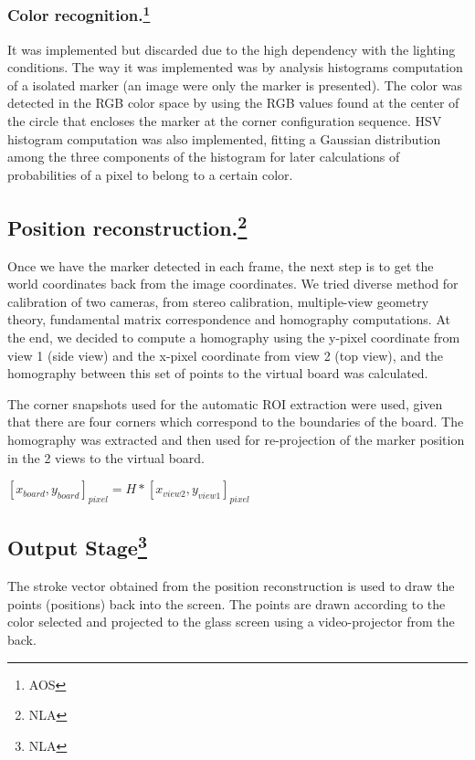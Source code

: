 \documentclass[a4paper,12pt]{article}
\begin{document}
\subsubsection[Color recognition]{Color recognition.\footnote{AOS}}
It was implemented but discarded due to the high dependency with the lighting conditions. The way it was implemented was by analysis histograms computation of a isolated marker (an image were only the marker is presented). The color was detected in the RGB color space by using the RGB values found at the center of the circle that encloses the marker at the corner configuration sequence. HSV histogram computation was also implemented, fitting a Gaussian distribution among the three components of the histogram for later calculations of probabilities of a pixel to belong to a certain color.

\subsection[Position reconstruction.]{Position reconstruction.\footnote{NLA}} 
Once we have the marker detected in each frame, the next step is to get the world coordinates back from the image coordinates. We tried diverse method for calibration of two cameras, from stereo calibration, multiple-view geometry theory, fundamental matrix correspondence and homography computations. At the end, we decided to compute a homography using the y-pixel coordinate from view 1 (side view) and the x-pixel coordinate from view 2 (top view), and the homography between this set of points to the virtual board was calculated. 

The corner snapshots used for the automatic ROI extraction were used, given that there are four corners which correspond to the boundaries of the board. The homography was extracted and then used for re-projection of the marker position in the 2 views to the virtual board.

\begin{center}
$ [x_{board}, y_{board}]_{pixel}= H*[x_{view2}, y_{view1}]_{pixel} $
\end{center}


\subsection[Output Stage]{Output Stage\footnote{NLA}} 
The stroke vector obtained from the position reconstruction is used to draw the points (positions) back into the screen. The points are drawn according to the color selected and projected to the glass screen using a video-projector from the back.
\end{document}
